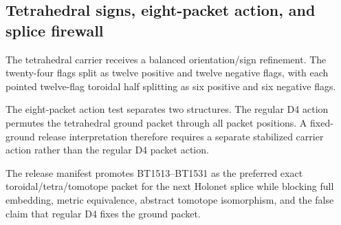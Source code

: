 \subsection{Tetrahedral signs, eight-packet action, and splice firewall}
\label{sec:bt1530-bt1532-orientation-d4-splice}

The tetrahedral carrier receives a balanced orientation/sign refinement.  The twenty-four flags split as twelve positive and twelve negative flags, with each pointed twelve-flag toroidal half splitting as six positive and six negative flags.

The eight-packet action test separates two structures.  The regular D4 action permutes the tetrahedral ground packet through all packet positions.  A fixed-ground release interpretation therefore requires a separate stabilized carrier action rather than the regular D4 packet action.

The release manifest promotes BT1513--BT1531 as the preferred exact toroidal/tetra/tomotope packet for the next Holonet splice while blocking full embedding, metric equivalence, abstract tomotope isomorphism, and the false claim that regular D4 fixes the ground packet.
